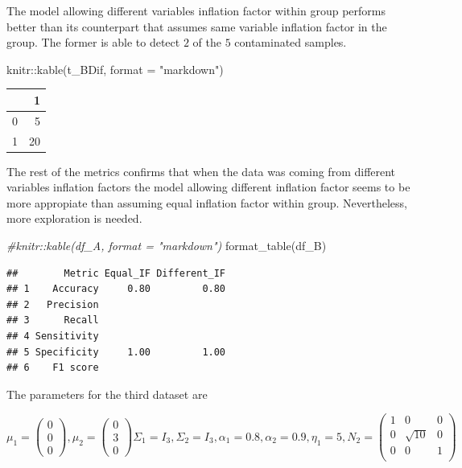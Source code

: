 \documentclass[
]{article}
\newenvironment{Shaded}{\begin{snugshade}}{\end{snugshade}}
\newcommand{\AttributeTok}[1]{\textcolor[rgb]{0.77,0.63,0.00}{#1}}
\newcommand{\CommentTok}[1]{\textcolor[rgb]{0.56,0.35,0.01}{\textit{#1}}}
\newcommand{\FunctionTok}[1]{\textcolor[rgb]{0.00,0.00,0.00}{#1}}
\newcommand{\NormalTok}[1]{#1}
\newcommand{\SpecialCharTok}[1]{\textcolor[rgb]{0.00,0.00,0.00}{#1}}
\newcommand{\StringTok}[1]{\textcolor[rgb]{0.31,0.60,0.02}{#1}}
\begin{document}
The model allowing different variables inflation factor within group
performs better than its counterpart that assumes same variable
inflation factor in the group. The former is able to detect \(2\) of the
\(5\) contaminated samples.

\begin{Shaded}
\begin{Highlighting}[]
\NormalTok{knitr}\SpecialCharTok{::}\FunctionTok{kable}\NormalTok{(t\_BDif, }\AttributeTok{format =} \StringTok{"markdown"}\NormalTok{)}
\end{Highlighting}
\end{Shaded}

\begin{longtable}[]{@{}lr@{}}
\toprule()
& 1 \\
\midrule()
\endhead
0 & 5 \\
1 & 20 \\
\bottomrule()
\end{longtable}

The rest of the metrics confirms that when the data was coming from
different variables inflation factors the model allowing different
inflation factor seems to be more appropiate than assuming equal
inflation factor within group. Nevertheless, more exploration is needed.

\begin{Shaded}
\begin{Highlighting}[]
\CommentTok{\#knitr::kable(df\_A, format = "markdown")}
\FunctionTok{format\_table}\NormalTok{(df\_B)}
\end{Highlighting}
\end{Shaded}

\begin{verbatim}
##        Metric Equal_IF Different_IF
## 1    Accuracy     0.80         0.80
## 2   Precision                      
## 3      Recall                      
## 4 Sensitivity                      
## 5 Specificity     1.00         1.00
## 6    F1 score
\end{verbatim}

The parameters for the third dataset are

\[
\mu_{1} = \begin{pmatrix} 0 \\ 0 \\  0 \end{pmatrix} ,  \mu_{2} = \begin{pmatrix} 0 \\ 3 \\ 0 \end{pmatrix}  \Sigma_{1} = I_{3}, \Sigma_{2} = I_{3}, \alpha_{1} = 0.8, \alpha_{2} = 0.9, \eta_{1} = 5,N_{2} = \begin{pmatrix} 1 & 0 & 0  \\ 0 & \sqrt{10} & 0  \\ 0 & 0 & 1  \\\end{pmatrix}
\]
\end{document}
